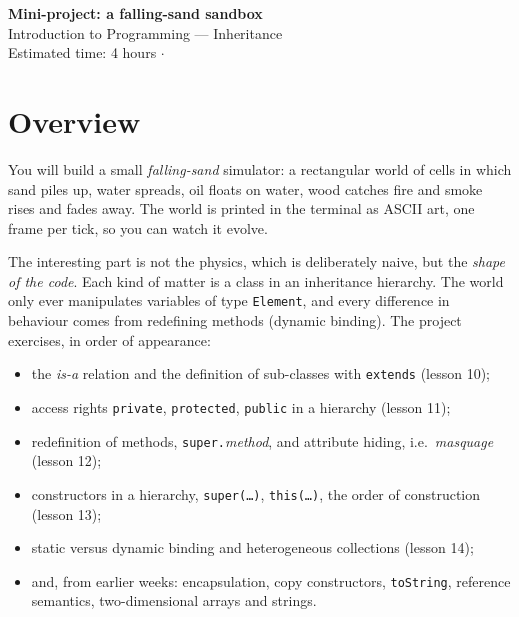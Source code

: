 \documentclass[11pt,a4paper]{article}
\newcommand{\code}[1]{\texttt{#1}}
\begin{document}
\begin{center}
  {\Large\bfseries Mini-project: a falling-sand sandbox}\\[0.6em]
  Introduction to Programming --- Inheritance\\[0.3em]
  {\small Estimated time: 4 hours \quad$\cdot$\quad}
\end{center}

\vspace{0.5em}

\section*{Overview}

You will build a small \emph{falling-sand} simulator: a rectangular world of cells in which sand
piles up, water spreads, oil floats on water, wood catches fire and smoke rises and fades away.
The world is printed in the terminal as ASCII art, one frame per tick, so you can watch it evolve.

The interesting part is not the physics, which is deliberately naive, but the \emph{shape of the
code}. Each kind of matter is a class in an inheritance hierarchy. The world only ever manipulates
variables of type \code{Element}, and every difference in behaviour comes from redefining methods
(dynamic binding). The project exercises, in order of appearance:
\begin{itemize}[nosep]
  \item the \emph{is-a} relation and the definition of sub-classes with \code{extends} (lesson 10);
  \item access rights \code{private}, \code{protected}, \code{public} in a hierarchy (lesson 11);
  \item redefinition of methods, \code{super.}\emph{method}, and attribute hiding, i.e.\ \emph{masquage} (lesson 12);
  \item constructors in a hierarchy, \code{super(\ldots)}, \code{this(\ldots)}, the order of construction (lesson 13);
  \item static versus dynamic binding and heterogeneous collections (lesson 14);
  \item and, from earlier weeks: encapsulation, copy constructors, \code{toString}, reference
        semantics, two-dimensional arrays and strings.
\end{itemize}
\end{document}

